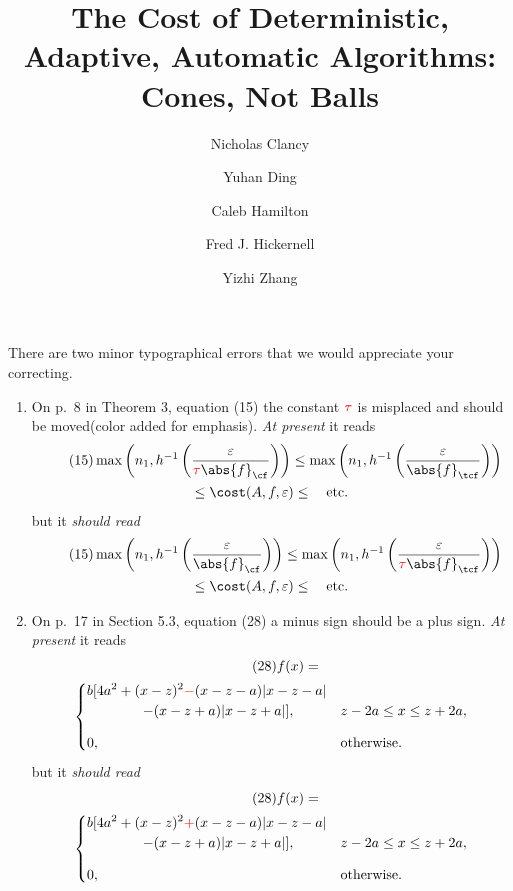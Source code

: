 \documentclass[]{elsarticle}
\theoremstyle{definition}
\theoremstyle{remark}
\newcommand{\Fnorm}[1]{\abs{#1}_{\cf}}
\newcommand{\Ftnorm}[1]{\abs{#1}_{\tcf}}
\begin{document}
\begin{frontmatter}

\title{The Cost of Deterministic, Adaptive, Automatic Algorithms:  Cones, Not Balls}
\author{Nicholas Clancy} 
\author{Yuhan Ding} 
\author{Caleb Hamilton} 
\author{Fred J. Hickernell} 
\author{Yizhi Zhang} 
\address{Room E1-208, Department of Applied Mathematics, Illinois Institute of Technology,\\ 10 W.\ 32$^{\text{nd}}$ St., Chicago, IL 60616}

\end{frontmatter}

There are two minor typographical errors that we would appreciate your correcting.

\begin{enumerate}

\item On p.\ 8 in Theorem 3, equation (15) the constant ${\color{red}\tau}$ is misplaced and should be moved(color added for emphasis).  \emph{At present} it reads
\begin{multline} \tag{15}
\max \left(n_1, h^{-1}\left(\frac{\varepsilon}{{\color{red}\tau} \Fnorm{f}} \right) \right) \le \max \left(n_1, h^{-1}\left(\frac{\varepsilon}{\Ftnorm{f}} \right) \right) \\ \le
\cost(A,f,\varepsilon) \le \quad \text{etc.}
\end{multline}
but it \emph{should read}
\begin{multline} \tag{15}
\max \left(n_1, h^{-1}\left(\frac{\varepsilon}{\Fnorm{f}} \right) \right) \le \max \left(n_1, h^{-1}\left(\frac{\varepsilon}{{\color{red}\tau} \Ftnorm{f}} \right) \right) \\ \le
\cost(A,f,\varepsilon) \le \quad \text{etc.}
\end{multline}

\item On p.\ 17 in Section 5.3, equation (28) a minus sign should be a plus sign.  \emph{At present} it reads
\begin{multline} \tag{28}
f(x)= \\
\begin{cases}
\displaystyle  b[4a^2 + (x-z)^2 {\color{red}-} (x-z-a)|x-z-a|\\
\qquad \qquad -(x-z+a)|x-z+a|], & z-2a\leq x\leq z+2a,\\[2ex]
\displaystyle  0, & \text{otherwise}.
\end{cases}
\end{multline}
but it \emph{should read}
\begin{multline} \tag{28}
f(x)= \\
\begin{cases}
\displaystyle  b[4a^2 + (x-z)^2 {\color{red}+} (x-z-a)|x-z-a|\\
\qquad \qquad -(x-z+a)|x-z+a|], & z-2a\leq x\leq z+2a,\\[2ex]
\displaystyle  0, & \text{otherwise}.
\end{cases}
\end{multline}

\end{enumerate}
\end{document}
